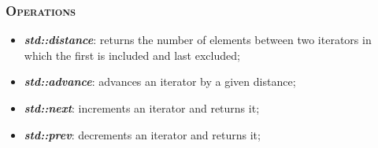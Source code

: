 \documentclass[10pt]{article}
\begin{document}
\begin{multicols*}{5}
{\subsubsection*{\textsc{Operations}} 
\begin{itemize}[leftmargin=*,topsep=0.25pt]
  \setlength\itemsep{.3pt}
	\item  \emph{\textbf{std::distance}}: returns the number of elements between two iterators in which the first is included and last excluded;
	\item  \emph{\textbf{std::advance}}: advances an iterator by a given distance;
	\item  \emph{\textbf{std::next}}: increments an iterator and returns it;
	\item  \emph{\textbf{std::prev}}: decrements an iterator and returns it;
\end{itemize}
}
\end{multicols*}
\end{document}
